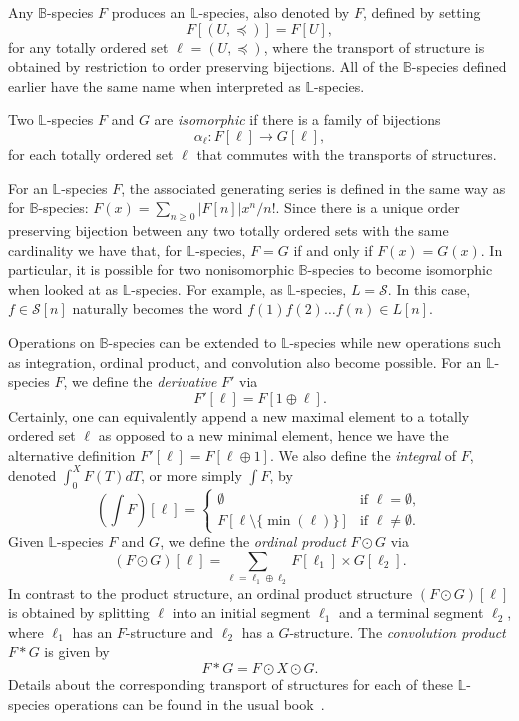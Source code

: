 \documentclass[a4paper, 11pt]{article}
\newcommand{\LL}{\mathbb{L}}
\newcommand{\BB}{\mathbb{B}}
\newcommand{\Sym}{\mathcal{S}}
\theoremstyle{definition}
\begin{document}
Any $\BB$-species $F$ produces an $\LL$-species, also denoted by
$F$, defined by setting
\[
  F[(U, \preceq)] = F[U],
\]
for any totally ordered set $\ell=(U,\preceq)$, where the transport of
structure is obtained by restriction to order preserving bijections. 
All of the $\BB$-species defined earlier have the same name when
interpreted as $\LL$-species. 

Two $\LL$-species $F$ and $G$ are \emph{isomorphic} if there is a family
of bijections
\[
\alpha_{\ell}: F[\ell] \to G[\ell],
\]
for each totally ordered set $\ell$ that commutes with the transports of
structures. 

For an $\LL$-species $F$, the associated generating series
is defined in the same way as for $\BB$-species:
$F(x) = \sum_{n \geq 0} |F[n]| x^n/n!$.
Since there is a unique order preserving 
bijection between any two totally ordered sets with the 
same cardinality we have that, for $\LL$-species, $F=G$ if and only if $F(x)=G(x)$.
In particular, it is possible for two
nonisomorphic $\BB$-species to become isomorphic when looked at
as $\LL$-species. 
For example, as $\LL$-species, $L=\Sym$. In this case,
$f \in \Sym[n]$ naturally becomes the word
$f(1) f(2) \ldots f(n) \in L[n].$

Operations on $\mathbb{B}$-species can be extended to $\LL$-species while new operations 
such as integration,
ordinal product, and convolution also become possible. 
For an $\LL$-species $F$, we define the \emph{derivative} $F'$ via
\[
F'[\ell] = F[1 \oplus \ell]. 
\]
Certainly, one can equivalently append a new maximal element to a totally ordered set 
$\ell$ as opposed to a new minimal element,
hence we have the alternative definition $F'[\ell] = F[\ell\oplus 1]$.
We also define the \emph{integral} of $F$, denoted $\int_0^X F(T) dT$, or more simply $\int F$, by
\[
\left( \int F \right) [\ell] =
\begin{cases}
  \emptyset &  \text{if }\ell = \emptyset, \\
  F[\ell \setminus \{\min(\ell)\}] & \text{if } \ell \neq \emptyset.
\end{cases}
\]
Given $\LL$-species $F$ and $G$, we define the \emph{ordinal product} $F\odot G$ via
\[
(F \odot G)[\ell] = \sum_{\ell=\ell_1 \oplus \ell_2} F[\ell_1] \times G[\ell_2].
\]
In contrast to the product structure, an ordinal product structure
$(F \odot G)[\ell]$ is obtained by splitting $\ell$ into an initial segment
$\ell_1$ and a terminal segment $\ell_2$, where $\ell_1$ has an $F$-structure
and $\ell_2$ has a $G$-structure.
The \emph{convolution product} $F*G$ is given by
\[
F * G = F \odot X \odot G.
\]
Details about the corresponding transport of structures for 
each of these $\LL$-species operations can be found in
the usual book~\cite{holybook}.
\end{document}
